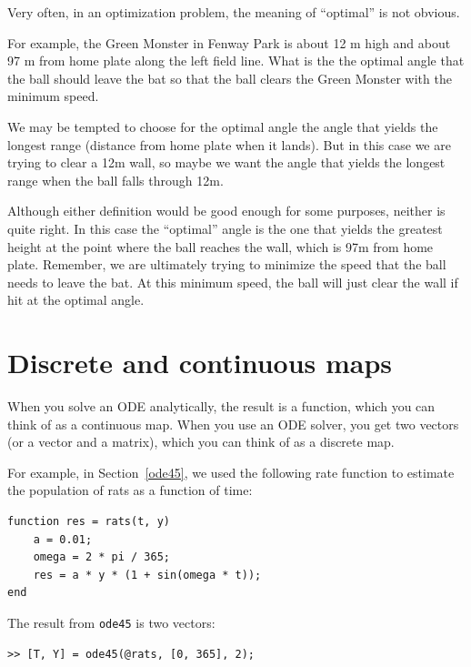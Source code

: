 \documentclass{book}
\begin{document}
\begin{ex}
Very often, in an optimization problem, the meaning of ``optimal'' is not obvious.

For example, the Green Monster in Fenway Park is about 12 m high and about 97
m from home plate along the left field line.
What is the
the optimal angle that the ball should leave
the bat so that the ball clears the Green Monster with the minimum speed.

We may be tempted
to choose for the optimal angle the angle that yields the longest
range (distance from home plate when it lands).  But in this
case we are trying to clear a 12m wall, so maybe we want
the angle that yields the longest range when the ball falls
through 12m.

Although either definition would be good enough for some purposes,
neither is quite right.  In this case the ``optimal'' angle is
the one that yields the greatest height at the point where
the ball reaches the wall, which is 97m from home plate.
Remember, we are ultimately trying to minimize
the speed that the ball needs to leave the bat.  At this minimum speed,
the ball will just clear the wall if hit at the optimal angle.
\end{ex}

\section{Discrete and continuous maps}

When you solve an ODE analytically, the result is a function,
which you can think of as a continuous map.  When you use an
ODE solver, you get two vectors (or a vector and a matrix), which
you can think of as a discrete map.

For example, in Section~\ref{ode45}, we used the following rate
function to estimate the population of rats as a function of time:

\begin{verbatim}
function res = rats(t, y)
    a = 0.01;
    omega = 2 * pi / 365;
    res = a * y * (1 + sin(omega * t));
end
\end{verbatim}

The result from {\tt ode45} is two vectors:

\begin{verbatim}
>> [T, Y] = ode45(@rats, [0, 365], 2);
\end{verbatim}
\end{document}
